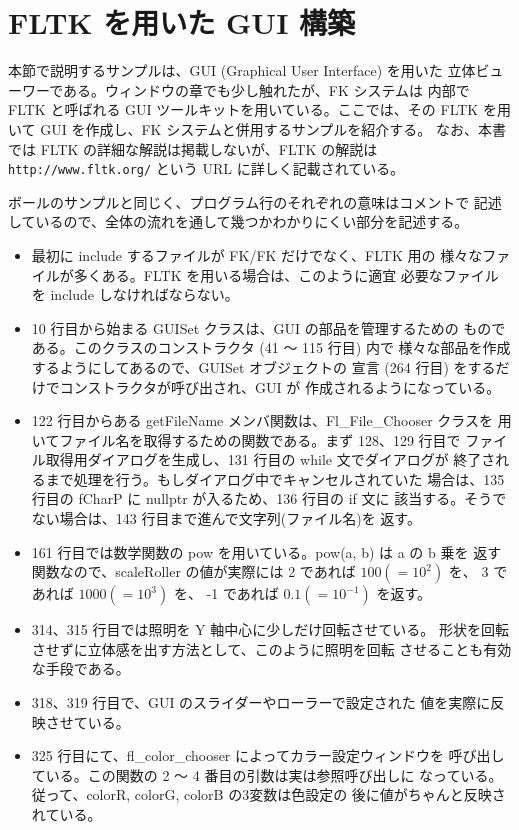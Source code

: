 \section{FLTK を用いた GUI 構築}
本節で説明するサンプルは、GUI (Graphical User Interface) を用いた
立体ビューワーである。ウィンドウの章でも少し触れたが、FK システムは
内部で FLTK と呼ばれる GUI ツールキットを用いている。ここでは、その
FLTK を用いて GUI を作成し、FK システムと併用するサンプルを紹介する。
なお、本書では FLTK の詳細な解説は掲載しないが、FLTK の解説は
\verb+http://www.fltk.org/+ という URL に詳しく記載されている。

ボールのサンプルと同じく、プログラム行のそれぞれの意味はコメントで
記述しているので、全体の流れを通して幾つかわかりにくい部分を記述する。
\begin{itemize}

 \item 最初に include するファイルが FK/FK だけでなく、FLTK 用の
	様々なファイルが多くある。FLTK を用いる場合は、このように適宜
	必要なファイルを include しなければならない。

 \item 10 行目から始まる GUISet クラスは、GUI の部品を管理するための
	ものである。このクラスのコンストラクタ (41 〜 115 行目) 内で
	様々な部品を作成するようにしてあるので、GUISet オブジェクトの
	宣言 (264 行目) をするだけでコンストラクタが呼び出され、GUI が
	作成されるようになっている。

 \item 122 行目からある getFileName メンバ関数は、Fl\_File\_Chooser クラスを
	用いてファイル名を取得するための関数である。まず 128、129 行目で
	ファイル取得用ダイアログを生成し、131 行目の while 文でダイアログが
	終了されるまで処理を行う。もしダイアログ中でキャンセルされていた
	場合は、135 行目の fCharP に nullptr が入るため、136 行目の if 文に
	該当する。そうでない場合は、143 行目まで進んで文字列(ファイル名)を
	返す。

 \item 161 行目では数学関数の pow を用いている。pow(a, b) は a の b 乗を
	返す関数なので、scaleRoller の値が実際には
	2 であれば \(100 (= 10^2)\) を、
	3 であれば \(1000 (= 10^3)\) を、
	-1 であれば \(0.1 (= 10^{-1})\) を返す。

 \item 314、315 行目では照明を Y 軸中心に少しだけ回転させている。
	形状を回転させずに立体感を出す方法として、このように照明を回転
	させることも有効な手段である。

 \item 318、319 行目で、GUI のスライダーやローラーで設定された
	値を実際に反映させている。

 \item 325 行目にて、fl\_color\_chooser によってカラー設定ウィンドウを
	呼び出している。この関数の 2 〜 4 番目の引数は実は参照呼び出しに
	なっている。従って、colorR, colorG, colorB の3変数は色設定の
	後に値がちゃんと反映されている。

\end{itemize}
